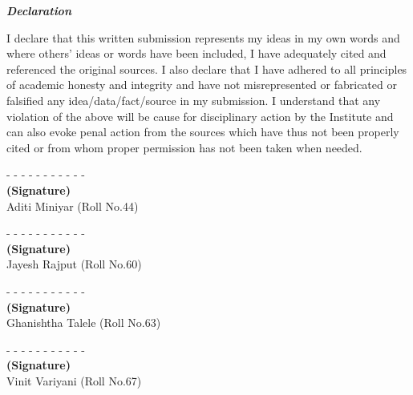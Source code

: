 \documentclass[a4paper, 12pt]{report}
\begin{document}
\begin{frontmatter}
\newpage
\begin{center}
{\Large{\bf{\textit{Declaration}}\\[2cm]}}
\end{center}
I declare that this written submission represents my ideas in my own words and where others' ideas or words have been included, I have adequately cited and referenced the original sources. I also declare that I have adhered to all principles of academic honesty and integrity and have not misrepresented or fabricated or falsified any idea/data/fact/source in my submission. I understand that any violation of the above will be cause for disciplinary action by the Institute and can also evoke penal action from the sources which have thus not been properly cited or from whom proper permission has not been taken when needed. 


\vspace{0.8in}
\begin{flushright}
- - - - - - - - - - - \\
\textbf{(Signature)}\\
\vspace{0.2in}
Aditi Miniyar (Roll No.44)\\
\end{flushright}

\vspace{0.6in}
\begin{flushright}
- - - - - - - - - - - \\
\textbf{(Signature)}\\
\vspace{0.2in}
Jayesh Rajput (Roll No.60)\\
\end{flushright}

\vspace{0.6in}
\begin{flushright}
- - - - - - - - - - - \\
\textbf{(Signature)}\\
\vspace{0.2in}
Ghanishtha Talele (Roll No.63)\\
\end{flushright}

\vspace{0.6in}
\begin{flushright}
- - - - - - - - - - - \\
\textbf{(Signature)}\\
\vspace{0.2in}
Vinit Variyani (Roll No.67)\\
\end{flushright}


\end{frontmatter}
\end{document}
